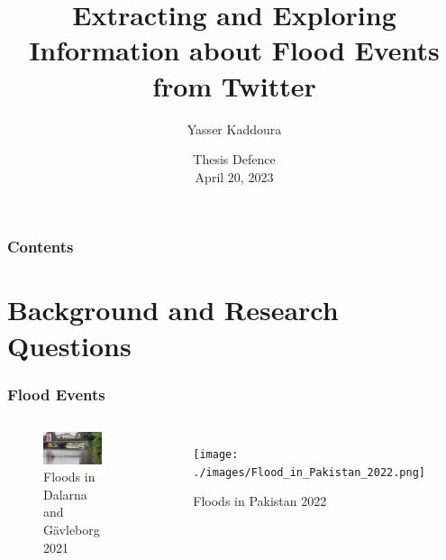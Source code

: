 \documentclass{beamer}
\title %
{Extracting and Exploring Information about Flood Events from Twitter}
\author %
{Yasser Kaddoura}
\institute[VFU] %
{
  Department of Information Technology\\
  Uppsala University
  \\[5mm]
  Supervisors:\\
  Carlo Navarra\inst{1},
  Katerina Vrotsou\inst{2},
  Kostiantyn Kucher\inst{2} \\
  \inst{1,2}%
  Linköping University,
  \inst{1}%
  Department of Thematic Studies, \\
  \inst{2}%
  Department of Science and Technology\\

}
\date %
{Thesis Defence\\ April 20, 2023}
\begin{document}

\begin{frame}
  \frametitle{Contents}
  \tableofcontents
\end{frame}

\section{Background and Research Questions}

\begin{frame}
  \frametitle{Flood Events}
  \begin{columns}[T]
    \begin{figure}
      \includegraphics[width=\textwidth]{./images/Floods-in-Gavle-Sweden-August-2021-Photo-Gov-of-Gavle-and-Anna-Jernberg.jpg}
      \caption{Floods in Dalarna and Gävleborg 2021\protect\footnotemark}
    \end{figure}
    \begin{figure}
      \texttt{[image: ./images/Flood\_in\_Pakistan\_2022.png]}
      \caption{Floods in Pakistan 2022\footnotemark}
    \end{figure}
  \end{columns}
\end{frame}
\end{document}
